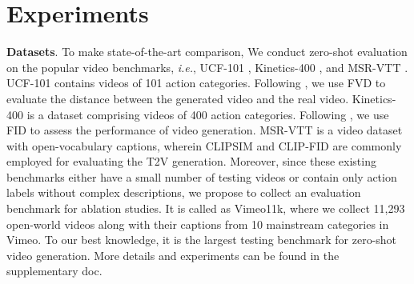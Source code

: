 \section{Experiments}
\label{sec:exper}


\textbf{Datasets}.
To make state-of-the-art comparison,
We conduct zero-shot evaluation on the popular video benchmarks,
\textit{i.e.},
UCF-101 \cite{Soomro2012UCF101AD}, 
Kinetics-400 \cite{Kay2017TheKH}, 
and 
MSR-VTT \cite{Chen2021TheMT}.
UCF-101 contains videos of 101 action categories.
Following \cite{unterthiner2019accurate},
we use FVD to evaluate the distance between the generated video and the real video.
Kinetics-400 is a dataset comprising videos of 400 action categories. 
Following \cite{li2017video, balaji2019Conditional, wu2022nwa, villegas2023phenaki},
we use FID \cite{heusel2017gans} to assess the performance of video generation.
MSR-VTT is a video dataset with open-vocabulary captions,  
wherein CLIPSIM \cite{Wu2021GODIVAGO} and CLIP-FID \cite{parmar2022aliased} are commonly employed for evaluating the T2V generation.
Moreover,
since these existing benchmarks either have a small number of testing videos or contain only action labels without complex descriptions,
we propose to collect an evaluation benchmark for ablation studies.
It is called as Vimeo11k,
where we collect 11,293 open-world videos along with their captions from 10 mainstream categories in Vimeo.
To our best knowledge,
it is the largest testing benchmark for zero-shot video generation. 
More details and experiments can be found in the supplementary doc.






